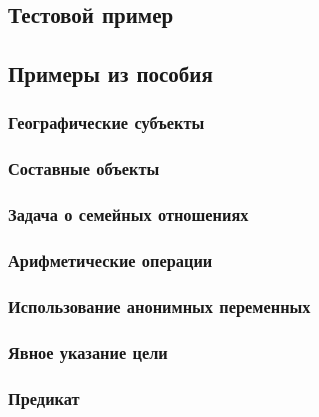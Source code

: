 \subsection{Тестовой пример }


\subsection{Примеры из пособия}

\subsubsection{Географические субъекты}


\subsubsection{Составные объекты}


\subsubsection{Задача о семейных отношениях}


\subsubsection{Арифметические операции}


\subsubsection{Использование анонимных переменных}


\subsubsection{Явное указание цели}


\subsubsection{Предикат }


